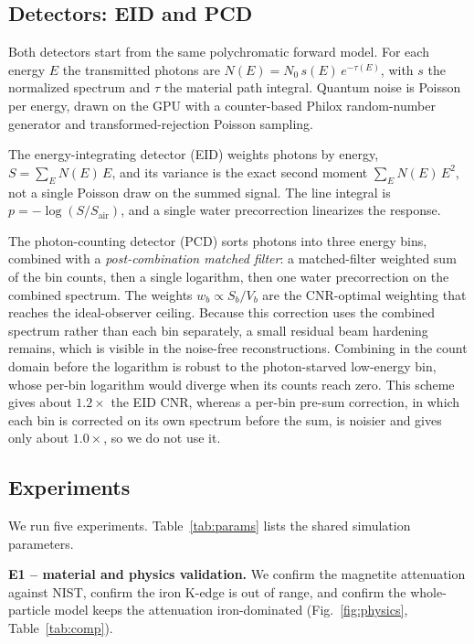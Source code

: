 \documentclass[]{spie}  %
\begin{document}
\subsection{Detectors: EID and PCD}
\label{sec:detectors}
Both detectors start from the same polychromatic forward model. For each energy $E$
the transmitted photons are $N(E)=N_0\,s(E)\,e^{-\tau(E)}$, with $s$ the normalized
spectrum and $\tau$ the material path integral. Quantum noise is Poisson per energy, drawn on the GPU with a counter-based Philox
random-number generator\cite{Salmon2011} and transformed-rejection Poisson
sampling\cite{Hormann1993}.

The energy-integrating detector (EID) weights photons by energy,
$S=\sum_E N(E)\,E$, and its variance is the exact second moment $\sum_E N(E)\,E^2$,
not a single Poisson draw on the summed signal. The line integral is
$p=-\log(S/S_{\mathrm{air}})$, and a single water precorrection linearizes the
response.

The photon-counting detector (PCD) sorts photons into three energy bins, combined
with a \emph{post-combination matched filter}: a matched-filter weighted sum of the
bin counts, then a single logarithm, then one water precorrection on the combined
spectrum. The weights $w_b \propto S_b/V_b$ are the CNR-optimal weighting that
reaches the ideal-observer ceiling. Because this correction uses the combined
spectrum rather than each bin separately, a small residual beam hardening remains,
which is visible in the noise-free reconstructions. Combining in the count domain before the
logarithm is robust to the photon-starved low-energy bin, whose per-bin logarithm
would diverge when its counts reach zero. This scheme gives about $1.2\times$ the
EID CNR, whereas a per-bin pre-sum correction, in which each bin is corrected on its
own spectrum before the sum, is noisier and gives only about $1.0\times$, so we do
not use it.

\subsection{Experiments}
\label{sec:experiments}
We run five experiments. Table~\ref{tab:params} lists the shared simulation
parameters.

\textbf{E1 -- material and physics validation.} We confirm the magnetite
attenuation against NIST, confirm the iron K-edge is out of range, and confirm the
whole-particle model keeps the attenuation iron-dominated
(Fig.~\ref{fig:physics}, Table~\ref{tab:comp}).
\end{document}
